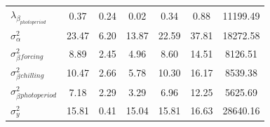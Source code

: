 \documentclass{article}\usepackage[]{graphicx}\usepackage[]{color}
\begin{document}
\begin{table}[H]
\begin{center}
\begin{tabular}{@{}lcccccc@{}}
$\lambda_\beta_{photoperiod}$  & 0.37                              & 0.24                            & 0.02                                & 0.34                              & 0.88                                 & 11199.49                            \\
$\sigma_\alpha^2$              & 23.47                             & 6.20                            & 13.87                               & 22.59                             & 37.81                                & 18272.58                            \\
$\sigma_\beta^2_{forcing}$     & 8.89                              & 2.45                            & 4.96                                & 8.60                              & 14.51                                & 8126.51                             \\
$\sigma_\beta^2_{chilling}$    & 10.47                             & 2.66                            & 5.78                                & 10.30                             & 16.17                                & 8539.38                             \\
$\sigma_\beta^2_{photoperiod}$ & 7.18                              & 2.29                            & 3.29                                & 6.96                              & 12.25                                & 5625.69                             \\
$\sigma_y^2$                   & 15.81                             & 0.41                            & 15.04                               & 15.81                             & 16.63                                & 28640.16                            \\ \bottomrule
\end{tabular}
\end{center}
\label{tab:modelgymlamb}
\end{table}





\pagebreak
%
\end{document}
